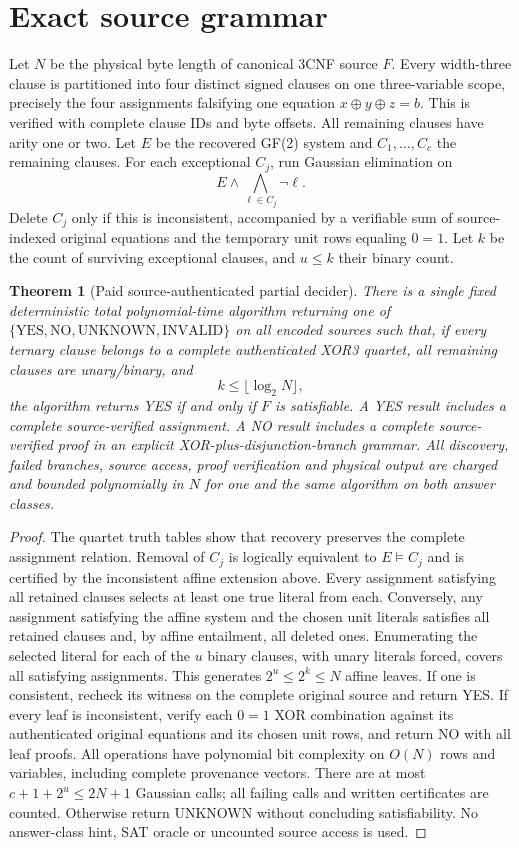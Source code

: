 \documentclass[11pt]{article}
\newtheorem{theorem}{Theorem}
\begin{document}
\section{Exact source grammar}
Let $N$ be the physical byte length of canonical 3CNF source $F$.
Every width-three clause is partitioned into four distinct signed
clauses on one three-variable scope, precisely the four assignments
falsifying one equation $x\oplus y\oplus z=b$. This is verified with
complete clause IDs and byte offsets. All remaining clauses have arity
one or two. Let $E$ be the recovered GF(2) system and
$C_1,\ldots,C_c$ the remaining clauses.
For each exceptional $C_j$, run Gaussian elimination on
\[
 E\wedge\bigwedge_{\ell\in C_j}\neg\ell.
\]
Delete $C_j$ only if this is inconsistent, accompanied by a verifiable
sum of source-indexed original equations and the temporary unit rows
equaling $0=1$. Let $k$ be the count of surviving exceptional clauses,
and $u\le k$ their binary count.
\begin{theorem}[Paid source-authenticated partial decider]
There is a single fixed deterministic total polynomial-time
algorithm returning one of
$\{\mathrm{YES},\mathrm{NO},\mathrm{UNKNOWN},\mathrm{INVALID}\}$
on all encoded sources such that, if every ternary clause belongs
to a complete authenticated XOR3 quartet, all remaining clauses
are unary/binary, and
\[
 k\le\lfloor\log_2 N\rfloor,
\]
the algorithm returns YES if and only if $F$ is satisfiable.
A YES result includes a complete source-verified assignment.
A NO result includes a complete source-verified proof in an
explicit XOR-plus-disjunction-branch grammar. All discovery,
failed branches, source access, proof verification and physical output
are charged and bounded polynomially in $N$ for one and the same
algorithm on both answer classes.
\end{theorem}
\begin{proof}
The quartet truth tables show that recovery preserves the complete
assignment relation. Removal of $C_j$ is logically equivalent to
$E\models C_j$ and is certified by the inconsistent affine
extension above. Every assignment satisfying all retained clauses
selects at least one true literal from each. Conversely, any
assignment satisfying the affine system and the chosen unit literals
satisfies all retained clauses and, by affine entailment, all deleted
ones. Enumerating the selected literal for each of the $u$ binary
clauses, with unary literals forced, covers all satisfying assignments.
This generates $2^u\le2^k\le N$ affine leaves.
If one is consistent, recheck its witness on the complete original
source and return YES. If every leaf is inconsistent, verify each
$0=1$ XOR combination against its authenticated original equations
and its chosen unit rows, and return NO with all leaf proofs.
All operations have polynomial bit complexity on $O(N)$ rows and
variables, including complete provenance vectors. There are at most
$c+1+2^u\le 2N+1$ Gaussian calls; all failing calls and written
certificates are counted. Otherwise return UNKNOWN without
concluding satisfiability. No answer-class hint, SAT oracle or
uncounted source access is used.
\end{proof}
\end{document}
